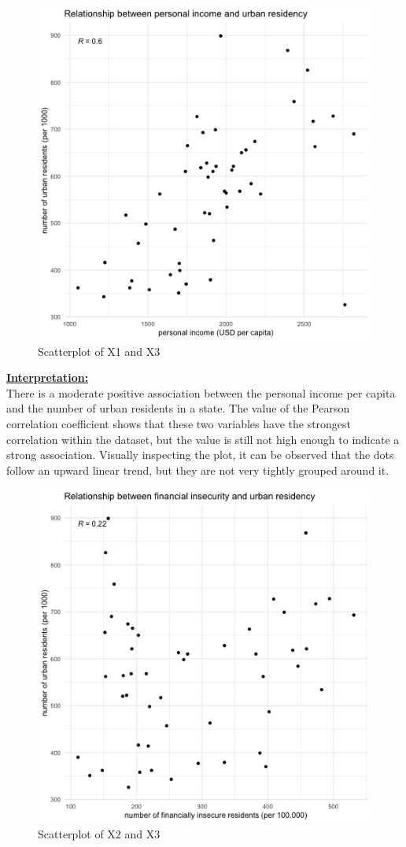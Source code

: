 \documentclass[12pt,letterpaper]{article}
\begin{document}
\begin{figure}[h!]\centering
	\caption{\footnotesize Scatterplot of X1 and X3}
	\label{fig:plot_5}
	\includegraphics[width=.7\textwidth]{scatter_x1_x3.png}
\end{figure}
\vspace{.5cm}
\underline{\textbf{Interpretation:}}\\[.3cm] There is a moderate positive association between the personal income per capita and the number of urban residents in a state. The value of the Pearson correlation coefficient shows that these two variables have the strongest correlation within the dataset, but the value is still not high enough to indicate a strong association. Visually inspecting the plot, it can be observed that the dots follow an upward linear trend, but they are not very tightly grouped around it. 
\newpage
 
\vspace{.5cm}
\begin{figure}[h!]\centering
	\caption{\footnotesize Scatterplot of X2 and X3}
	\label{fig:plot_6}
	\includegraphics[width=.7\textwidth]{scatter_x2_x3.png}
\end{figure}
\end{document}
